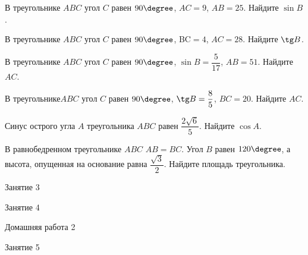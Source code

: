 \begin{homework}[number=1]
	\begin{listofex}
		\item В треугольнике \( ABC \) угол \( C \) равен \( 90\degree \), \( AC=9 \), \( AB=25 \). Найдите \( \sin B \).
		\item В треугольнике \( ABC \) угол \( C \) равен \( 90\degree \), BC\( =4 \), \( AC=28 \). Найдите \( \tg B \).
		\item В треугольнике \( ABC \) угол \( C \) равен \( 90\degree \), \( \sin B=\dfrac{5}{17} \), \( AB=51 \). Найдите \( AC \).
		\item В треугольнике\( ABC \) угол \( C \) равен \( 90\degree \), \( \tg B=\dfrac{8}{5} \), \( BC=20 \). Найдите \( AC \).
		\item Синус острого угла \( A \) треугольника \( ABC \) равен \( \dfrac{2\sqrt{6}}{5} \). Найдите \( \cos A \).
		\item В равнобедренном треугольнике \( ABC \) \( AB=BC \). Угол \( B \) равен \( 120\degree \), а высота, опущенная на основание равна \( \dfrac{\sqrt{3}}{2} \). Найдите площадь треугольника.
	\end{listofex}
\end{homework}

\begin{class}[number=3]
	\begin{listofex}
		\item Занятие 3 
	\end{listofex}
\end{class}

\begin{class}[number=4]
	\begin{listofex}
		\item Занятие 4
	\end{listofex}
\end{class}

\begin{homework}[number=2]
	\begin{listofex}
		\item Домашняя работа 2
	\end{listofex}
\end{homework}

\begin{class}[number=5]
	\begin{listofex}
		\item Занятие 5
	\end{listofex}
\end{class}

